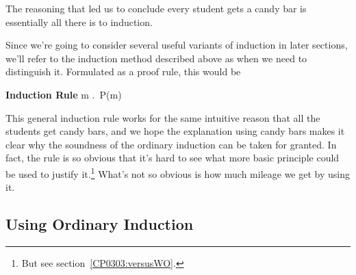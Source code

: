 
The reasoning that led us to conclude every student gets a candy bar is 
essentially all there is to induction.
\iffalse
So our claim that all the Professor's students get a candy bar was simply
an application of the Induction Rule with $P(n)$ defined to be the
predicate, ``student $n$ gets a candy bar.''
\fi

Since we're going to consider several useful variants of induction in
later sections, we'll refer to the induction method described above as
 when we need to distinguish it.  Formulated as 
a proof rule, this would be
\begin{rul*} \textbf{Induction Rule}
{\forall m \in \naturals.\, P(m)}
\end{rul*}

This general induction rule works for the same intuitive reason that all
the students get candy bars, and we hope the explanation using candy bars
makes it clear why the soundness of the ordinary induction can be taken
for granted.  In fact, the rule is so obvious that it's hard to see what
more basic principle could be used to justify it.\footnote{But see
section~\ref{CP0303:versusWO}.}  What's not so obvious is how much mileage 
we get by using it.

\subsection{Using Ordinary Induction}


